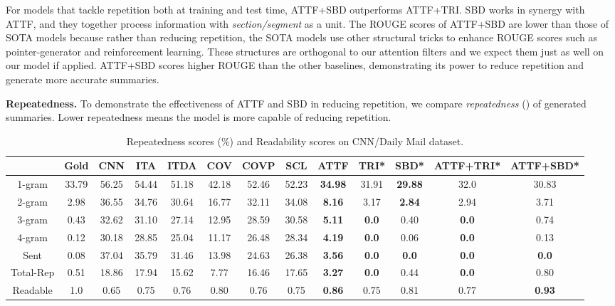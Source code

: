 For models that tackle repetition both at training and test time, 
ATTF+SBD outperforms ATTF+TRI.
SBD works in synergy with ATTF, and they together process 
information with \textit{section/segment} as a unit.
The ROUGE scores of ATTF+SBD are lower than
those of SOTA models 
because rather than reducing repetition, the SOTA models use 
other structural tricks to enhance ROUGE scores 
such as pointer-generator and reinforcement learning.
These structures are orthogonal 
to our attention filters
and we expect them just as well on our model if applied.
ATTF+SBD scores higher ROUGE than the other baselines, 
demonstrating its power to  reduce 
repetition and generate more accurate summaries.

\textbf{Repeatedness.}
To demonstrate the effectiveness of ATTF and SBD in reducing repetition, 
we compare \textit{repeatedness} () 
of generated summaries.
Lower repeatedness 
means the model is more capable of reducing repetition.

\begin{table}[th]
	\centering
	\scriptsize
	\begin{tabular}{|c|c|ccccccc|cccc|}
		\hline
	            & Gold & CNN  & ITA & ITDA & COV & COVP & SCL & ATTF & TRI* & SBD* & ATTF+TRI* & ATTF+SBD* \\
		\hline
		1-gram & 33.79 & 56.25 & 54.44 & 51.18 & 42.18 & 52.46 & 52.23 & \bf 34.98 & 31.91 & \bf 29.88 & 32.0 & 30.83 \\
		2-gram & 2.98 & 36.55 & 34.76 & 30.64 & 16.77 & 32.11 & 34.08 & \bf 8.16 & 3.17 & \bf 2.84 & 2.94 & 3.71 \\
		3-gram & 0.43 & 32.62 & 31.10 & 27.14 & 12.95 & 28.59 & 30.58 & \bf 5.11 & \bf 0.0 & 0.40 & \bf 0.0 & 0.74 \\
		4-gram & 0.12 & 30.18 & 28.85 & 25.04 & 11.17 & 26.48 & 28.34 & \bf 4.19 & \bf 0.0 & 0.06 & \bf 0.0 & 0.13 \\
		Sent & 0.08 & 37.04 & 35.79 & 31.46 & 13.98 & 24.63 & 26.38 & \bf 3.56 & \bf 0.0 & \bf 0.0 & \bf 0.0 & \bf 0.0 \\
		\hline
		Total-Rep & 0.51 & 18.86 & 17.94 & 15.62 & 7.77 & 16.46 & 17.65 & \bf 3.27 & \bf 0.0 & 0.44 & \bf 0.0 & 0.80 \\
		\hline
		Readable & 1.0 & 0.65 & 0.75 & 0.76 & 0.80 & 0.76 & 0.75 & \bf 0.86 & 0.75 & 0.81 & 0.77 & \bf 0.93 \\
		\hline
	\end{tabular}
	\caption{Repeatedness scores (\%) and Readability scores on CNN/Daily Mail dataset.}
	\label{tab:eval_repe}
\end{table}

